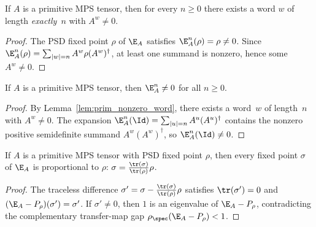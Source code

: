 \begin{lemma}\label{lem:prim_nonzero_word}
    \leanok
    If $A$ is a primitive MPS tensor,
    then for every $n\ge0$ there exists a word $w$ of length
    \emph{exactly}~$n$ with $A^w\neq0$.
\end{lemma}

\begin{proof}\leanok
    The PSD fixed point $\rho$ of $\E_A$ satisfies
    $\E_A^n(\rho)=\rho\neq0$.
    Since
    $\E_A^n(\rho)=\sum_{|w|=n}A^w\rho(A^w)^\dagger$,
    at least one summand is nonzero, hence some $A^w\neq0$.
\end{proof}

\begin{lemma}\label{lem:transfer_pow_ne_zero}
    \leanok
    If $A$ is a primitive MPS tensor, then
    $\E_A^n\neq0$ for all $n\ge0$.
\end{lemma}

\begin{proof}\leanok{}
    By Lemma~\ref{lem:prim_nonzero_word}, there exists a word~$w$ of
    length~$n$ with $A^w\neq0$.
    The expansion
    $\E_A^n(\Id)=\sum_{|u|=n}A^u(A^u)^\dagger$
    contains the nonzero positive semidefinite summand
    $A^w(A^w)^\dagger$, so $\E_A^n(\Id)\neq0$.
\end{proof}

\begin{lemma}%
    \label{lem:fixedpoint_unique_spectral}
    \leanok
    If $A$ is a primitive MPS tensor
    with PSD fixed point $\rho$,
    then every fixed point $\sigma$ of $\E_A$ is proportional
    to $\rho$: $\sigma=\frac{\tr(\sigma)}{\tr(\rho)}\rho$.
\end{lemma}

\begin{proof}\leanok
    The traceless difference $\sigma'=\sigma-\frac{\tr(\sigma)}{\tr(\rho)}\rho$
    satisfies $\tr(\sigma')=0$ and $(\E_A-P_\rho)(\sigma')=\sigma'$.
    If $\sigma'\neq0$, then $1$ is an eigenvalue of $\E_A-P_\rho$,
    contradicting the complementary transfer-map gap
    $\rho_{\spec}(\E_A-P_\rho)<1$.
\end{proof}

